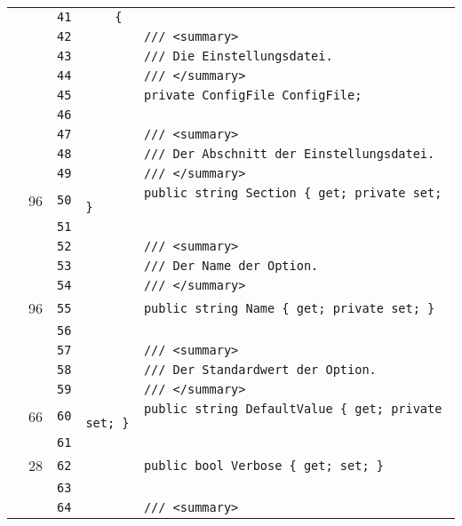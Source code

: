 \documentclass[a4paper,10pt]{article}
\begin{document}
\begin{longtable}[l]{lrrl}
\cellcolor{gray} &  & \verb~41~ & \verb~    {~\\
\cellcolor{gray} &  & \verb~42~ & \verb~        /// <summary>~\\
\cellcolor{gray} &  & \verb~43~ & \verb~        /// Die Einstellungsdatei.~\\
\cellcolor{gray} &  & \verb~44~ & \verb~        /// </summary>~\\
\cellcolor{gray} &  & \verb~45~ & \verb~        private ConfigFile ConfigFile;~\\
\cellcolor{gray} &  & \verb~46~ & \verb~~\\
\cellcolor{gray} &  & \verb~47~ & \verb~        /// <summary>~\\
\cellcolor{gray} &  & \verb~48~ & \verb~        /// Der Abschnitt der Einstellungsdatei.~\\
\cellcolor{gray} &  & \verb~49~ & \verb~        /// </summary>~\\
\cellcolor{green} & 96 & \verb~50~ & \verb~        public string Section { get; private set; }~\\
\cellcolor{gray} &  & \verb~51~ & \verb~~\\
\cellcolor{gray} &  & \verb~52~ & \verb~        /// <summary>~\\
\cellcolor{gray} &  & \verb~53~ & \verb~        /// Der Name der Option.~\\
\cellcolor{gray} &  & \verb~54~ & \verb~        /// </summary>~\\
\cellcolor{green} & 96 & \verb~55~ & \verb~        public string Name { get; private set; }~\\
\cellcolor{gray} &  & \verb~56~ & \verb~~\\
\cellcolor{gray} &  & \verb~57~ & \verb~        /// <summary>~\\
\cellcolor{gray} &  & \verb~58~ & \verb~        /// Der Standardwert der Option.~\\
\cellcolor{gray} &  & \verb~59~ & \verb~        /// </summary>~\\
\cellcolor{green} & 66 & \verb~60~ & \verb~        public string DefaultValue { get; private set; }~\\
\cellcolor{gray} &  & \verb~61~ & \verb~~\\
\cellcolor{green} & 28 & \verb~62~ & \verb~        public bool Verbose { get; set; }~\\
\cellcolor{gray} &  & \verb~63~ & \verb~~\\
\cellcolor{gray} &  & \verb~64~ & \verb~        /// <summary>~\\

\end{longtable}
\end{document}
